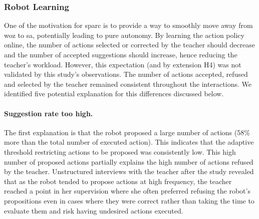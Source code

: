 
\subsubsection{Robot Learning} \label{sec:tutoring_disc_learning}

One of the motivation for \gls{sparc} is to provide a way to smoothly move away from \gls{woz} to \gls{sa}, potentially leading to pure autonomy. By learning the action policy online, the number of actions selected or corrected by the teacher should decrease and the number of accepted suggestions should increase, hence reducing the teacher's workload. However, this expectation (and by extension H4) was not validated by this study's observations. The number of actions accepted, refused and selected by the teacher remained consistent throughout the interactions. We identified five potential explanation for this differences discussed below.

\paragraph{Suggestion rate too high.}

The first explanation is that the robot proposed a large number of actions (58\% more than the total number of executed action). This indicates that the adaptive threshold restricting actions to be proposed was consistently low. This high number of proposed actions partially explains the high number of actions refused by the teacher. Unstructured interviews with the teacher after the study revealed that as the robot tended to propose actions at high frequency, the teacher reached a point in her supervision where she often preferred refusing the robot's propositions even in cases where they were correct rather than taking the time to evaluate them and risk having undesired actions executed. 

